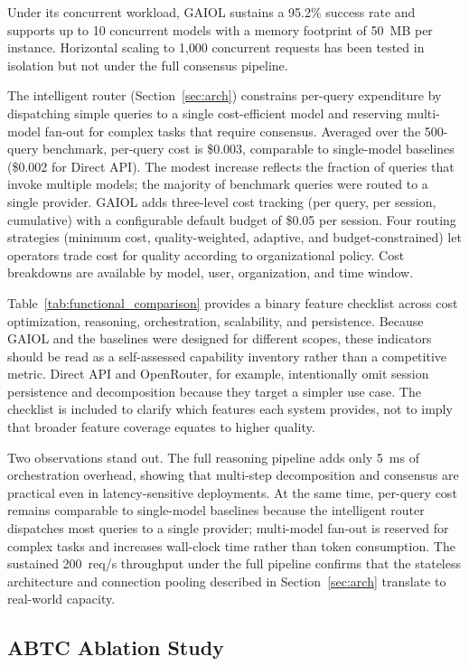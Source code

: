 \documentclass{iopjournal}
\begin{document}
Under its concurrent workload, GAIOL sustains a 95.2\% success rate and supports up to 10 concurrent models with a memory footprint of 50~MB per instance. Horizontal scaling to 1{,}000 concurrent requests has been tested in isolation but not under the full consensus pipeline.

The intelligent router (Section~\ref{sec:arch}) constrains per-query expenditure by dispatching simple queries to a single cost-efficient model and reserving multi-model fan-out for complex tasks that require consensus. Averaged over the 500-query benchmark, per-query cost is \$0.003, comparable to single-model baselines (\$0.002 for Direct API). The modest increase reflects the fraction of queries that invoke multiple models; the majority of benchmark queries were routed to a single provider. GAIOL adds three-level cost tracking (per query, per session, cumulative) with a configurable default budget of \$0.05 per session. Four routing strategies (minimum cost, quality-weighted, adaptive, and budget-constrained) let operators trade cost for quality according to organizational policy. Cost breakdowns are available by model, user, organization, and time window.

Table~\ref{tab:functional_comparison} provides a binary feature checklist across cost optimization, reasoning, orchestration, scalability, and persistence. Because GAIOL and the baselines were designed for different scopes, these indicators should be read as a self-assessed capability inventory rather than a competitive metric. Direct API and OpenRouter, for example, intentionally omit session persistence and decomposition because they target a simpler use case. The checklist is included to clarify which features each system provides, not to imply that broader feature coverage equates to higher quality.

Two observations stand out. The full reasoning pipeline adds only 5~ms of orchestration overhead, showing that multi-step decomposition and consensus are practical even in latency-sensitive deployments. At the same time, per-query cost remains comparable to single-model baselines because the intelligent router dispatches most queries to a single provider; multi-model fan-out is reserved for complex tasks and increases wall-clock time rather than token consumption. The sustained 200~req/s throughput under the full pipeline confirms that the stateless architecture and connection pooling described in Section~\ref{sec:arch} translate to real-world capacity.

\subsection{ABTC Ablation Study}
\label{sec:abtc_ablation}
\end{document}
